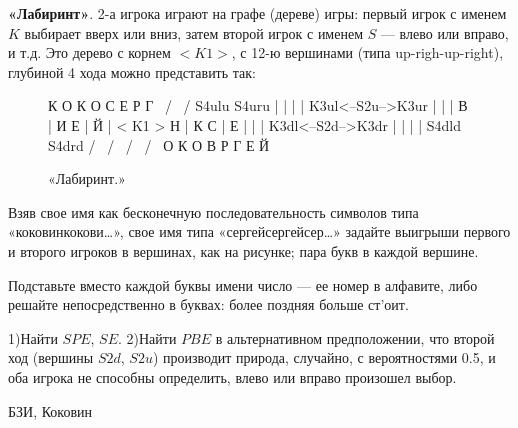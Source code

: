 \begin{problem}

{\bf «Лабиринт»}.  2-а игрока играют на графе
(дереве) игры: первый игрок с именем $K$ выбирает вверх или
вниз, затем второй игрок с именем $S$ — влево или вправо, и
т.д. Это дерево с корнем $<K1>$, с 12-ю вершинами (типа
up-righ-up-right), глубиной 4 хода можно представить так:

\begin{figure}[ht]
 К   О        К    О
 С   Е        Р    Г
  \  /         \  /
  S4ulu       S4uru
    |           |
    |           |
   K3ul<--S2u-->K3ur
    |     |     |
    В     |     И
    Е     |     Й
          |
        < K1 >
    Н     |     К
    С     |     Е
    |     |     |
   K3dl<--S2d-->K3dr
    |           |
    |           |
  S4dld        S4drd
  /  \         /  \
 /    \       /    \
О     К      О      В
Р     Г      Е      Й
\caption{«Лабиринт.»}
\end{figure}

Взяв свое имя как бесконечную последовательность символов
типа «коковинкокови\ldots », свое имя типа
«сергейсергейсер\ldots » задайте выигрыши первого и второго
игроков в вершинах, как на рисунке; пара букв в каждой
вершине.

Подставьте вместо каждой буквы имени число — ее номер в
алфавите, либо решайте непосредственно в буквах: более
поздняя больше ст'оит.

1)Найти $SPE$, $SE$. 2)Найти $PBE$ в альтернативном
предположении, что второй ход (вершины $S2d$, $S2u$)
производит природа, случайно, с вероятностями 0.5, и оба
игрока не способны определить, влево или вправо произошел
выбор.



\begin{source}
БЗИ, Коковин
\end{source}


\begin{sol}

\end{sol}
\end{problem}





